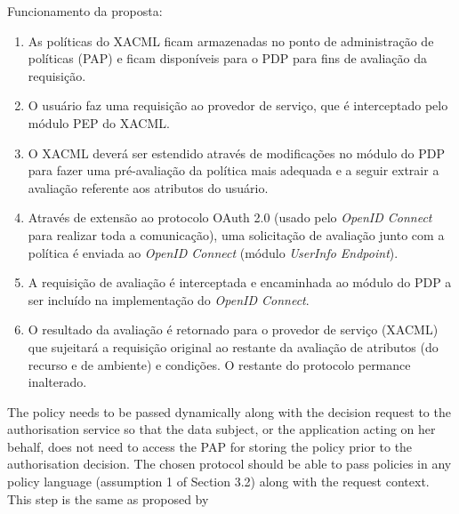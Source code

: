 \documentclass{doublecol-new}
\begin{document}
Funcionamento da proposta: 
\begin{enumerate}
	\item As políticas do XACML ficam armazenadas no ponto de administração de políticas (PAP) e ficam disponíveis para o PDP para fins de avaliação da requisição.
	\item O usuário faz uma requisição ao provedor de serviço, que é interceptado pelo módulo PEP do XACML.
	\item O XACML deverá ser estendido através de modificações no módulo do PDP para fazer uma pré-avaliação da política mais adequada e a seguir extrair a avaliação referente aos atributos do usuário.
	\item Através de extensão ao protocolo OAuth 2.0 (usado pelo \textit{OpenID Connect} para realizar toda a comunicação), uma solicitação de avaliação junto com a política é enviada ao \textit{OpenID Connect} (módulo \textit{UserInfo Endpoint}).
	\item A requisição de avaliação é interceptada e encaminhada ao módulo do PDP a ser incluído na implementação do \textit{OpenID Connect}.
	\item O resultado da avaliação é retornado para o provedor de serviço (XACML) que sujeitará a requisição original ao restante da avaliação de atributos (do recurso e de ambiente) e condições. O restante do protocolo permance inalterado.
\end{enumerate}   


The policy needs to be passed dynamically along with the decision request to the authorisation service so that the data
subject, or the application acting on her behalf, does not need to access the PAP for storing the policy prior to the authorisation decision. The chosen protocol should be able to pass policies in any policy language (assumption 1 of Section 3.2) along with the request context.
This step is the same as proposed by \cite{chadwick2012privacy} \cite{fatema2013adding}

\end{document}
